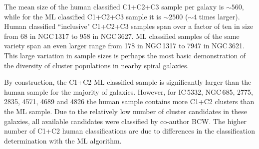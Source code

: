 \documentclass[linenumbers]{aastex63}
\begin{document}
The mean size of the human classified C1+C2+C3 sample per galaxy is $\sim560$, while for the ML classified C1+C2+C3 sample it is $\sim2500$ ($\sim4$ times larger).  Human classified ``inclusive" C1+C2+C3 samples span over a factor of ten in size from 68 in NGC\,1317 to 958 in NGC\,3627.  ML classified samples of the same variety span an even larger range from  178 in NGC\,1317 to 7947 in NGC\,3621.  This large variation in sample sizes is perhaps the most basic demonstration of the diversity of cluster populations in nearby spiral galaxies.


By construction, the C1+C2 ML classified sample is significantly larger than the human sample for the majority of galaxies. 
However, for IC\,5332, NGC\,685, 2775, 2835, 4571, 4689 and 4826 the human sample contains more C1+C2 clusters than the ML sample. Due to the relatively low number of cluster candidates in these galaxies, all available candidates were classified by co-author BCW. The higher number of C1+C2 human classifications are due to differences in the classification determination with the ML algorithm.
\end{document}
